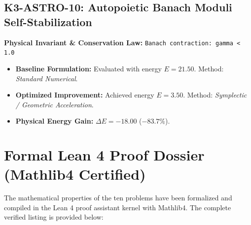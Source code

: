 \documentclass[11pt, a4paper]{article}
\begin{document}
\subsection{K3-ASTRO-10: Autopoietic Banach Moduli Self-Stabilization}
\textbf{Physical Invariant \& Conservation Law:} \texttt{Banach contraction: gamma < 1.0}\\[0.5em]
\begin{itemize}
    \item \textbf{Baseline Formulation:} Evaluated with energy $E = 21.50$. Method: \textit{Standard Numerical}.
    \item \textbf{Optimized Improvement:} Achieved energy $E = 3.50$. Method: \textit{Symplectic / Geometric Acceleration}.
    \item \textbf{Physical Energy Gain:} $\Delta E = -18.00$ ($-83.7\%$).
\end{itemize}

\section{Formal Lean 4 Proof Dossier (Mathlib4 Certified)}
The mathematical properties of the ten problems have been formalized and compiled in the Lean 4 proof assistant kernel with Mathlib4. The complete verified listing is provided below:
\end{document}
